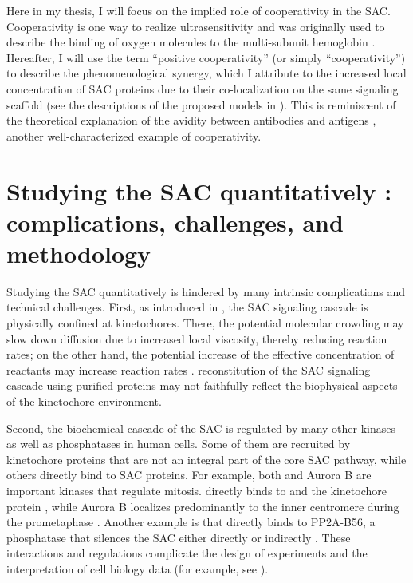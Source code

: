 Here in my thesis, I will focus on the implied role of cooperativity in the SAC. Cooperativity is one way to realize ultrasensitivity and was originally used to describe the binding of oxygen molecules to the multi-subunit hemoglobin \cite{KNF, MWC}. Hereafter, I will use the term ``positive cooperativity'' (or simply ``cooperativity'') to describe the phenomenological synergy, which I attribute to the increased local concentration of SAC proteins due to their co-localization on the same signaling scaffold (see the descriptions of the proposed models in ). This is reminiscent of the theoretical explanation of the avidity between antibodies and antigens \cite{AvidityMath}, another well-characterized example of cooperativity.

\section{Studying the SAC quantitatively : complications, challenges, and methodology}
\label{TechnicalChallenges}

Studying the SAC quantitatively  is hindered by many intrinsic complications and technical challenges. First, as introduced in , the SAC signaling cascade is physically confined at kinetochores. There, the potential molecular crowding may slow down diffusion due to increased local viscosity, thereby reducing reaction rates; on the other hand, the potential increase of the effective concentration of reactants may increase reaction rates \cite{MolecularCrowding}.  reconstitution of the SAC signaling cascade using purified proteins may not faithfully reflect the biophysical aspects of the kinetochore environment.

Second, the biochemical cascade of the SAC is regulated by many other kinases as well as phosphatases in human cells. Some of them are recruited by kinetochore proteins that are not an integral part of the core SAC pathway, while others directly bind to SAC proteins. For example, both  and Aurora B are important kinases that regulate mitosis.  directly binds to  and the kinetochore protein  \cite{CENPU+BUB1-PLK1}, while Aurora B localizes predominantly to the inner centromere during the prometaphase \cite{BUB1_pH2A_AuroraB}. Another example is that  directly binds to PP2A-B56, a phosphatase that silences the SAC either directly \cite{PP2ADephosphorylatesKNL1, PP2ADephosphorylatesBUB1} or indirectly \cite{BUBR1_KT-MT, Suijkerbuijk2012, BUBR1-L669A+I672A, PP2A-B56-BUBR1ChromosomeCongression_Xu2013, PP2A-B56}. These interactions and regulations complicate the design of  experiments and the interpretation of cell biology data (for example, see ).

